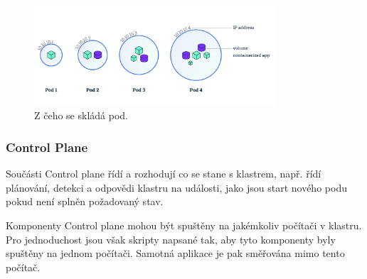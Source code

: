 \begin{figure}[!ht]
	\centering
 	\includegraphics[width=0.8\textwidth, angle=0]{kubernetes-pod.png}
 	\caption[Kubernetes Pod]{Z čeho se skládá pod.}\label{fig:pod}
\end{figure}



\subsubsection{Control Plane}

Součásti Control plane řídí a rozhodují co se stane s klastrem, např. řídí plánování, detekci a odpovědi klastru na události, jako jsou start nového podu pokud není splněn požadovaný stav. 

Komponenty Control plane mohou být spuštěny na jakémkoliv počítači v klastru. Pro jednoduchost jsou však skripty napsané tak, aby tyto komponenty byly spuštěny na jednom počítači. Samotná aplikace je pak směřována mimo tento počítač. 

